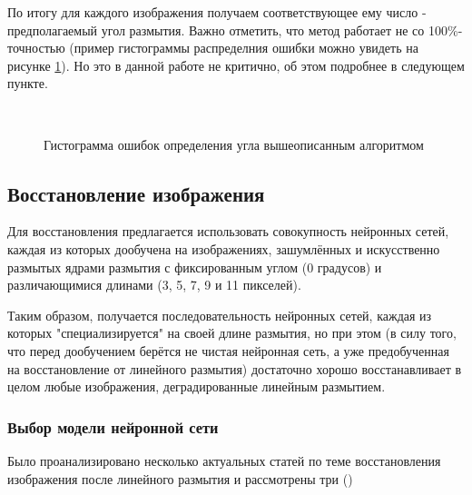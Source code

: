 По итогу для каждого изображения получаем соответствующее ему число - предполагаемый угол размытия. Важно отметить, что метод работает не со 100\%-точностью (пример гистограммы распределния ошибки можно увидеть на рисунке \ref{ris:angle_histogram}). Но это в данной работе не критично, об этом подробнее в следующем пункте.

\begin{figure}[H]
 \\ 
\caption{Гистограмма ошибок определения угла вышеописанным алгоритмом}
\label{ris:angle_histogram}
\end{figure}

\newpage
\subsection{Восстановление изображения}
Для восстановления предлагается использовать совокупность нейронных сетей, каждая из которых дообучена на изображениях, зашумлённых и искусственно размытых ядрами размытия с фиксированным углом (0 градусов)
и различающимися длинами (3, 5, 7, 9 и 11 пикселей).

Таким образом, получается последовательность нейронных сетей, каждая из которых "специализируется" на своей длине размытия, но при этом (в силу того, что перед дообучением берётся не чистая нейронная сеть, а уже предобученная на восстановление от линейного размытия) достаточно хорошо восстанавливает в целом любые изображения, деградированные линейным размытием. 

\subsubsection{Выбор модели нейронной сети}
Было проанализировано несколько актуальных статей по теме восстановления изображения после линейного размытия и рассмотрены три (\cite{dganv2, jin, srn}) 

